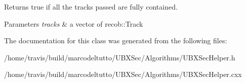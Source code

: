 Returns true if all the tracks passed are fully contained. 


\begin{DoxyParams}{Parameters}
{\em tracks} & a vector of recob\-::\-Track \\
\hline
\end{DoxyParams}


The documentation for this class was generated from the following files\-:\begin{DoxyCompactItemize}
\item 
/home/travis/build/marcodeltutto/\-U\-B\-X\-Sec/\-Algorithms/U\-B\-X\-Sec\-Helper.\-h\item 
/home/travis/build/marcodeltutto/\-U\-B\-X\-Sec/\-Algorithms/U\-B\-X\-Sec\-Helper.\-cxx\end{DoxyCompactItemize}
